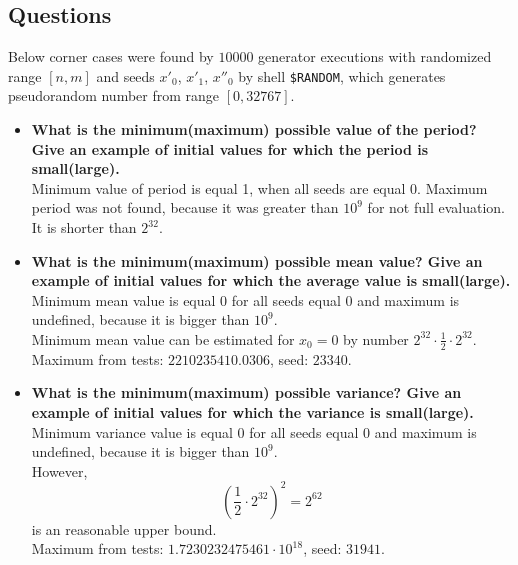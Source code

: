 \documentclass[a4paper,10pt]{article}
\begin{document}
\subsection{Questions}
Below corner cases were found by $10000$ generator executions with randomized range $[n,m]$ and seeds ${x'_0}$, ${x'_1}$, ${x''_0}$ by shell \texttt{\$RANDOM}, which generates pseudorandom number from range $[0,32767]$.
\begin{itemize}
 \item \textbf{What is the minimum(maximum) possible value of the period? Give an example of initial values for which the period is small(large).} \\ 
Minimum value of period is equal 1, when all seeds are equal 0. Maximum period was not found, because it was greater than $10^9$ for not full evaluation. It is shorter than $2^{32}$.
 \item \textbf{What is the minimum(maximum) possible mean value? Give an example of initial values for which the average value is small(large).} \\
Minimum mean value is equal 0 for all seeds equal 0 and maximum is undefined, because it is bigger than $10^9$. \\
Minimum mean value can be estimated for $x_0 = 0$ by number $2^{32} \cdot \frac{1}{2} \cdot 2^{32} $. \\
Maximum from tests: $2210235410.0306$, seed: $23340$.
 \item \textbf{What is the minimum(maximum) possible variance? Give an example of initial values for which the variance is small(large).} \\
Minimum variance value is equal 0 for all seeds equal 0 and maximum is undefined, because it is bigger than $10^9$. \\
However, $$(\frac{1}{2} \cdot 2^{32})^2 = 2^{62}$$ is an reasonable upper bound. \\
Maximum from tests: $1.7230232475461\cdot 10^{18}$, seed: $31941$.


\end{itemize}
\end{document}
